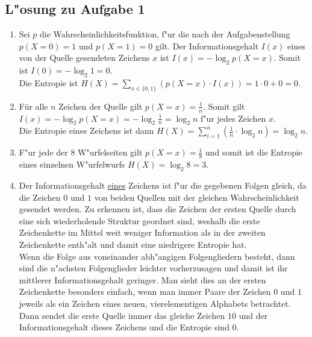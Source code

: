 \documentclass[10pt,oneside,onecolumn,a4paper,german,titlepage]{article}
\begin{document}
\newpage

\subsection*{L"osung zu Aufgabe 1}
\begin{enumerate}
\item Sei $p$ die Wahrscheinlichkeitsfunktion, f"ur die nach der Aufgabenstellung
$p(X=0) = 1$ und $p(X=1) = 0$ gilt. Der Informationsgehalt $I(x)$ eines von der
Quelle gesendeten Zeichens $x$ ist $I(x) = -\log_2{p(X=x)}$.
Somit ist $I(0) = -\log_2{1} = 0$.\\
Die Entropie ist $H(X) = \sum\limits_{x \in \{0,1\}}(p(X=x) \cdot I(x)) =
1 \cdot 0 + 0 = 0$.
\item Für alle $n$ Zeichen der Quelle gilt $p(X=x) = \frac{1}{n}$. Somit gilt $I(x)=
-\log_2{p(X=x)} = -\log_2{\frac{1}{n}} = \log_2{n}$ f"ur jedes Zeichen $x$.\\
Die Entropie eines Zeichens ist dann $H(X) = \sum\limits_{i=1}^n(\frac{1}{n} \cdot
\log_2{n}) = \log_2{n}$.
\item F"ur jede der 8 W"urfelseiten gilt $p(X=x) = \frac{1}{8}$ und somit ist die
Entropie eines einzelnen W"urfelwurfs $H(X) = \log_2{8} = 3$.
\item Der Informationsgehalt \underline{eines} Zeichens ist f"ur die gegebenen Folgen
gleich, da die Zeichen $0$ und $1$ von beiden Quellen mit der gleichen
Wahrscheinlichkeit gesendet werden. Zu erkennen ist, dass die Zeichen der ersten
Quelle durch eine sich wiederholende Struktur geordnet sind, weshalb die erste
Zeichenkette im Mittel weit weniger Information als in der zweiten Zeichenkette
enth"alt und damit eine niedrigere Entropie hat.\\
Wenn die Folge aus voneinander abh"angigen Folgengliedern besteht, dann sind die
n"achsten Folgenglieder leichter vorherzusagen und damit ist ihr mittlerer
Informationsgehalt geringer. Man sieht dies an der ersten Zeichenkette besonders
einfach, wenn man immer Paare der Zeichen $0$ und $1$ jeweils als ein Zeichen eines
neuen, vierelementigen Alphabets betrachtet. Dann sendet die erste Quelle immer das
gleiche Zeichen $10$ und der Informationsgehalt dieses Zeichens und die Entropie
sind $0$.
\end{enumerate}
\end{document}
